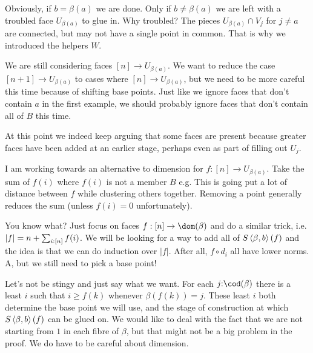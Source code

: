 \documentclass[csh.tex]{subfiles}
\begin{document}
Obviously, if $b=\beta(a)$ we are done. Only if $b\neq\beta(a)$ we are left with a troubled face $U_{\beta(a)}$ to glue in. Why troubled? The pieces $U_{\beta(a)}\cap V_j$ for $j\neq a$ are connected, but may not have a single point in common. That is why we introduced the helpers $W$.

We are still considering faces $[n]\to U_{\beta(a)}$. We want to reduce the case $[n + 1]\to U_{\beta(a)}$ to cases where $[n]\to U_{\beta(a)}$, but we need to be more careful this time because of shifting
base points.
Just like we ignore faces that don't contain $a$ in the first example, we should probably ignore faces that don't contain all of $B$ this time.

At this point we indeed keep arguing that some faces are present because
greater faces have been added at an earlier stage, perhaps even as part of filling out $U_j$.

I am working towards an alternative to dimension for $f:[n]\to U_{\beta(a)}$. Take the sum of $f(i)$ where $f(i)$ is not a member $B$ e.g.
This is going put a lot of distance between $f$ while clustering others together. Removing a point generally reduces the sum (unless $f(i) = 0$ unfortunately). 

You know what? Just focus on faces $f:[n]\to \dom(\beta)$ and do a similar trick, i.e. $|f| = n + \sum_{i\mathord : [n]} f(i)$. We
will be looking for a way to add all of $S\left\langle \beta,b \right\rangle(f)$ and the
idea is that we can do induction over $|f|$. After all, $f\circ d_i$ all have lower norms. A, but we still need to pick a base point!

Let's not be stingy and just say what we want.
For each $j\of \cod(\beta)$ there is a least $i$ such that $i \geq f(k)$ whenever $\beta(f(k)) = j$. These least $i$ both determine the base point we will use, and the stage of
construction at which $S\left\langle \beta,b \right\rangle(f)$ can be glued on. We would
like to deal with the fact that we are not starting from $1$ in each fibre of $\beta$, but that might not be a big problem in the proof. We do have to be careful about dimension.
\end{document}
